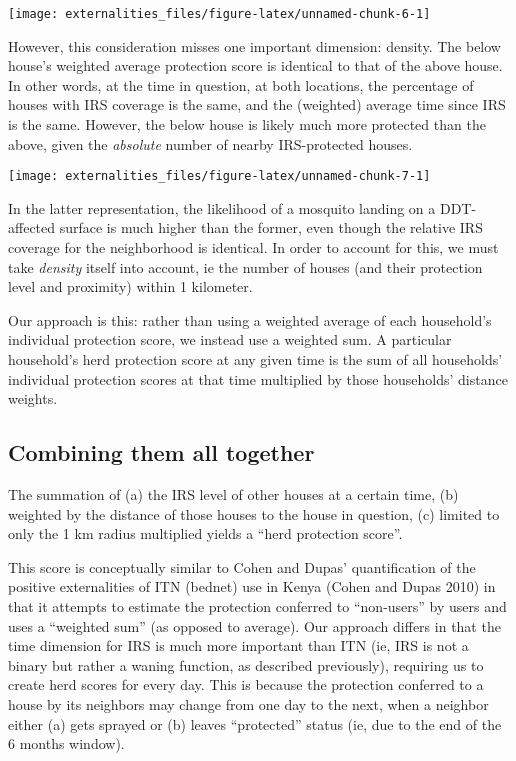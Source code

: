 \documentclass[]{article}
\begin{document}
\begin{center}\texttt{[image: externalities\_files/figure-latex/unnamed-chunk-6-1]} \end{center}

However, this consideration misses one important dimension: density. The
below house's weighted average protection score is identical to that of
the above house. In other words, at the time in question, at both
locations, the percentage of houses with IRS coverage is the same, and
the (weighted) average time since IRS is the same. However, the below
house is likely much more protected than the above, given the
\emph{absolute} number of nearby IRS-protected houses.

\begin{center}\texttt{[image: externalities\_files/figure-latex/unnamed-chunk-7-1]} \end{center}

In the latter representation, the likelihood of a mosquito landing on a
DDT-affected surface is much higher than the former, even though the
relative IRS coverage for the neighborhood is identical. In order to
account for this, we must take \emph{density} itself into account, ie
the number of houses (and their protection level and proximity) within 1
kilometer.

Our approach is this: rather than using a weighted average of each
household's individual protection score, we instead use a weighted sum.
A particular household's herd protection score at any given time is the
sum of all households' individual protection scores at that time
multiplied by those households' distance weights.

\subsection{Combining them all
together}\label{combining-them-all-together}

The summation of (a) the IRS level of other houses at a certain time,
(b) weighted by the distance of those houses to the house in question,
(c) limited to only the 1 km radius multiplied yields a ``herd
protection score''.

This score is conceptually similar to Cohen and Dupas' quantification of
the positive externalities of ITN (bednet) use in Kenya (Cohen and Dupas
2010) in that it attempts to estimate the protection conferred to
``non-users'' by users and uses a ``weighted sum'' (as opposed to
average). Our approach differs in that the time dimension for IRS is
much more important than ITN (ie, IRS is not a binary but rather a
waning function, as described previously), requiring us to create herd
scores for every day. This is because the protection conferred to a
house by its neighbors may change from one day to the next, when a
neighbor either (a) gets sprayed or (b) leaves ``protected'' status (ie,
due to the end of the 6 months window).
\end{document}
